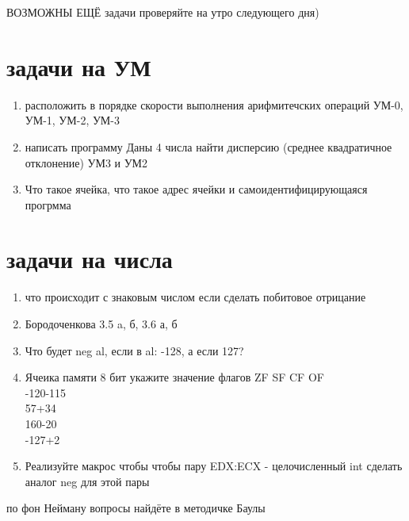 \documentclass[a4paper,10pt]{article}
\begin{document}
ВОЗМОЖНЫ ЕЩЁ задачи проверяйте на утро следующего дня)

\section*{задачи на УМ}
\begin{enumerate}
    \item расположить в порядке скорости выполнения арифмитечских операций УМ-0, УМ-1, УМ-2, УМ-3
    \item написать программу Даны 4 числа найти дисперсию (среднее квадратичное отклонение) УМ3 и УМ2
    \item Что такое ячейка, что такое адрес ячейки и самоидентифицирующаяся прогрмма
\end{enumerate}

\section*{задачи на числа}
\begin{enumerate}
    \item что происходит с знаковым числом если сделать побитовое отрицание
    \item Бородоченкова 3.5 a, б, 3.6 а, б
    \item Что будет neg al, если в al: -128, а если 127? 
    \item Ячеика памяти 8 бит укажите значение флагов ZF SF CF OF \\
    -120-115\\
    57+34\\
    160-20\\
    -127+2\\
    \item Реализуйте макрос чтобы чтобы пару EDX:ECX - целочисленный int сделать аналог neg для этой пары
\end{enumerate}
 
по фон Нейману вопросы найдёте в методичке Баулы
\end{document}
